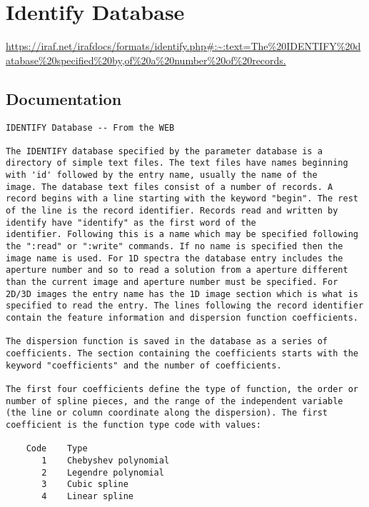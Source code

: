\section{Identify Database}

\url{https://iraf.net/irafdocs/formats/identify.php#:~:text=The%20IDENTIFY%20database%20specified%20by,of%20a%20number%20of%20records.}

\subsection{Documentation}


\begingroup \fontsize{10pt}{10pt}
\selectfont
\begin{verbatim} 
IDENTIFY Database -- From the WEB

The IDENTIFY database specified by the parameter database is a
directory of simple text files. The text files have names beginning
with 'id' followed by the entry name, usually the name of the
image. The database text files consist of a number of records. A
record begins with a line starting with the keyword "begin". The rest
of the line is the record identifier. Records read and written by
identify have "identify" as the first word of the
identifier. Following this is a name which may be specified following
the ":read" or ":write" commands. If no name is specified then the
image name is used. For 1D spectra the database entry includes the
aperture number and so to read a solution from a aperture different
than the current image and aperture number must be specified. For
2D/3D images the entry name has the 1D image section which is what is
specified to read the entry. The lines following the record identifier
contain the feature information and dispersion function coefficients.

The dispersion function is saved in the database as a series of
coefficients. The section containing the coefficients starts with the
keyword "coefficients" and the number of coefficients.

The first four coefficients define the type of function, the order or
number of spline pieces, and the range of the independent variable
(the line or column coordinate along the dispersion). The first
coefficient is the function type code with values:

	Code	Type
	   1	Chebyshev polynomial
	   2	Legendre polynomial
	   3	Cubic spline
	   4	Linear spline


\end{verbatim}
